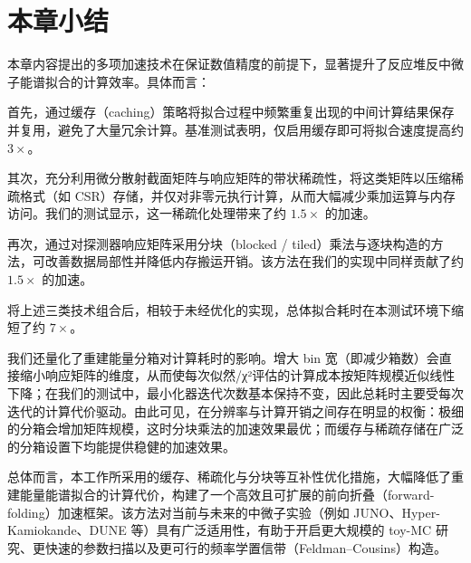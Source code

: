 \section{本章小结}
\label{sec:ch3_summary}
本章内容提出的多项加速技术在保证数值精度的前提下，显著提升了反应堆反中微子能谱拟合的计算效率。具体而言：

首先，通过缓存（caching）策略将拟合过程中频繁重复出现的中间计算结果保存并复用，避免了大量冗余计算。基准测试表明，仅启用缓存即可将拟合速度提高约 $3\times$。

其次，充分利用微分散射截面矩阵与响应矩阵的带状稀疏性，将这类矩阵以压缩稀疏格式（如 CSR）存储，并仅对非零元执行计算，从而大幅减少乘加运算与内存访问。我们的测试显示，这一稀疏化处理带来了约 $1.5\times$ 的加速。

再次，通过对探测器响应矩阵采用分块（blocked / tiled）乘法与逐块构造的方法，可改善数据局部性并降低内存搬运开销。该方法在我们的实现中同样贡献了约 $1.5\times$ 的加速。

将上述三类技术组合后，相较于未经优化的实现，总体拟合耗时在本测试环境下缩短了约 $7\times$。

我们还量化了重建能量分箱对计算耗时的影响。增大 bin 宽（即减少箱数）会直接缩小响应矩阵的维度，从而使每次似然/χ²评估的计算成本按矩阵规模近似线性下降；在我们的测试中，最小化器迭代次数基本保持不变，因此总耗时主要受每次迭代的计算代价驱动。由此可见，在分辨率与计算开销之间存在明显的权衡：极细的分箱会增加矩阵规模，这时分块乘法的加速效果最优；而缓存与稀疏存储在广泛的分箱设置下均能提供稳健的加速效果。

总体而言，本工作所采用的缓存、稀疏化与分块等互补性优化措施，大幅降低了重建能量能谱拟合的计算代价，构建了一个高效且可扩展的前向折叠（forward-folding）加速框架。该方法对当前与未来的中微子实验（例如 JUNO、Hyper-Kamiokande、DUNE 等）具有广泛适用性，有助于开启更大规模的 toy-MC 研究、更快速的参数扫描以及更可行的频率学置信带（Feldman–Cousins）构造。


